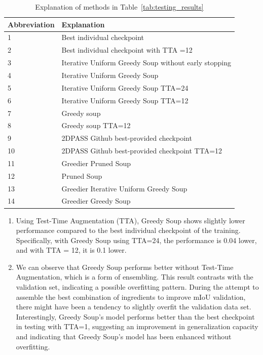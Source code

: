 \documentclass[10pt,twocolumn,letterpaper]{article}
\begin{document}
\begin{table}[!htb]
\footnotesize
\caption{Explanation of methods in Table~\ref{tab:testing_results}}
\label{tab:explanation}
\begin{tabular}{|l|l|}
\hline
\textbf{Abbreviation} & \textbf{Explanation} \\
\hline
1 & Best individual checkpoint   \label{row:1}\\
\hline
2 & Best individual checkpoint with TTA =12 \label{row:2}\\
\hline
3 & Iterative Uniform Greedy Soup without early stopping \label{row:3}\\
\hline
4 & Iterative Uniform Greedy Soup   \label{row:4} \\
\hline
5 & Iterative Uniform Greedy Soup  TTA=24 \label{row:5} \\
\hline
6 & Iterative Uniform Greedy Soup   TTA=12 \label{row:6} \\
\hline
7 &  Greedy soup \label{row:7} \\
\hline
8 &  Greedy soup TTA=12 \label{row:8} \\
\hline
9 & 2DPASS Github best-provided checkpoint \label{row:9}  \\
\hline
10 & 2DPASS Github best-provided checkpoint TTA=12 \label{row:10} \\
\hline
11 & Greedier Pruned Soup \label{row:11} \\
\hline
12 & Pruned Soup \label{row:12} \\
\hline
13 & Greedier Iterative Uniform Greedy Soup \label{row:13} \\
\hline
14 & Greedier Greedy Soup \label{row:14} \\
\hline
\end{tabular}
\end{table}
\begin{enumerate}
\item Using Test-Time Augmentation (TTA), Greedy Soup shows slightly lower performance compared to the best individual checkpoint of the training. Specifically, with Greedy Soup using TTA=24, the performance is 0.04 lower, and with TTA = 12, it is 0.1 lower.
\item We can observe that Greedy Soup performs better without Test-Time Augmentation, which is a form of ensembling. This result contrasts with the validation set, indicating a possible overfitting pattern. During the attempt to assemble the best combination of ingredients to improve mIoU validation, there might have been a tendency to slightly overfit the validation data set. Interestingly, Greedy Soup's model performs better than the best checkpoint in testing with TTA=1, suggesting an improvement in generalization capacity and indicating that Greedy Soup's model has been enhanced without overfitting.
\end{enumerate}
\end{document}
